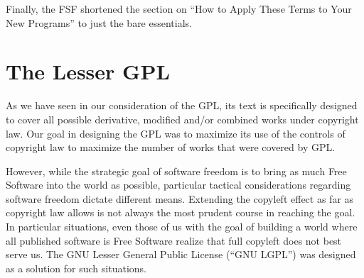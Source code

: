 




Finally, the FSF shortened the section on ``How to Apply These
Terms to Your New Programs'' to just the bare essentials.

\chapter{The Lesser GPL}

As we have seen in our consideration of the GPL, its text is specifically
designed to cover all possible derivative, modified and/or combined works under copyright law. Our
goal in designing the GPL was to maximize its use of the controls of
copyright law to maximize the number of works that were covered by GPL. 

However, while the strategic goal of software freedom is to bring as much Free Software
into the world as possible, particular tactical considerations
regarding software freedom dictate different means. Extending the
copyleft effect as far as copyright law allows is not always the most
prudent course in reaching the goal. In particular situations, even
those of us with the goal of building a world where all published
software is Free Software realize that full copyleft does not best
serve us. The GNU Lesser General Public License (``GNU LGPL'') was
designed as a solution for such situations.

